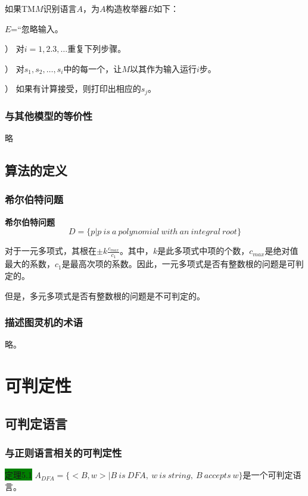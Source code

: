 \documentclass[a4paper]{article}
\begin{document}
	如果TM$M$识别语言$A$，为$A$构造枚举器$E$如下：
	
	$E$=“忽略输入。
	
	） 对$i=1,2.3,\dots$重复下列步骤。
	
	） 对$s_1,s_2,\dots,s_i$中的每一个，让$M$以其作为输入运行$i$步。
	
	） 如果有计算接受，则打印出相应的$s_j$。

\subsubsection{与其他模型的等价性}

	略

\subsection{算法的定义}

\subsubsection{希尔伯特问题}

	\textbf{希尔伯特问题}
	$$D=\{p|p~is~a~polynomial~with~an~integral~root\}$$

	对于一元多项式，其根在$\pm k\frac{c_{max}}{c_1}$。其中，$k$是此多项式中项的个数，$c_{max}$是绝对值最大的系数，$c_1$是最高次项的系数。因此，一元多项式是否有整数根的问题是可判定的。
	
	但是，多元多项式是否有整数根的问题是不可判定的。

\subsubsection{描述图灵机的术语}

	略。

\section{可判定性}

\subsection{可判定语言}

\subsubsection{与正则语言相关的可判定性}

	\colorbox{green}{定理5.1} $A_{DFA}=\{<B,w>|B~is~DFA,~w~is~string,~B~accepts~w\}$是一个可判定语言。
	
\end{document}
